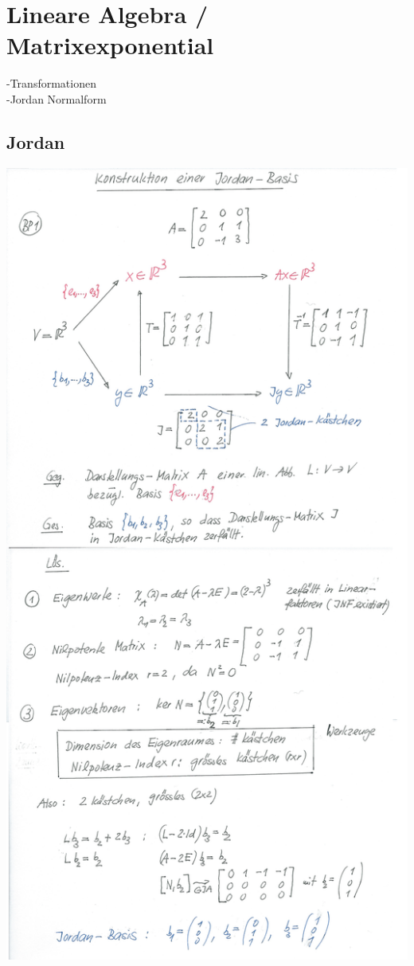 \section{Lineare Algebra / Matrixexponential}
-Transformationen\\
-Jordan Normalform\\
\subsection{Jordan}
\begin{minipage}[h]{0.65\textwidth}
	\includegraphics[width=1.0\textwidth]{images/Jordan.png}
\end{minipage}
